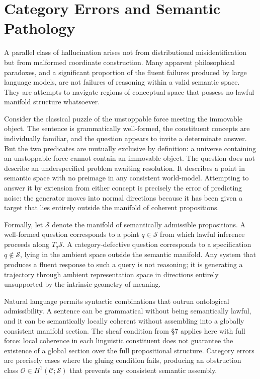 \documentclass[11pt,a4paper,twocolumn]{article}
\begin{document}
\section{Category Errors and Semantic Pathology}

A parallel class of hallucination arises not from distributional
misidentification but from malformed coordinate construction. Many
apparent philosophical paradoxes, and a significant proportion of
the fluent failures produced by large language models, are not
failures of reasoning within a valid semantic space. They are
attempts to navigate regions of conceptual space that possess no
lawful manifold structure whatsoever.

Consider the classical puzzle of the unstoppable force meeting the
immovable object. The sentence is grammatically well-formed, the
constituent concepts are individually familiar, and the question
appears to invite a determinate answer. But the two predicates are
mutually exclusive by definition: a universe containing an
unstoppable force cannot contain an immovable object. The question
does not describe an underspecified problem awaiting resolution. It
describes a point in semantic space with no preimage in any
consistent world-model. Attempting to answer it by extension from
either concept is precisely the error of predicting noise: the
generator moves into normal directions because it has been given
a target that lies entirely outside the manifold of coherent
propositions.

Formally, let $\mathcal{S}$ denote the manifold of semantically
admissible propositions. A well-formed question corresponds to a
point $q \in \mathcal{S}$ from which lawful inference proceeds
along $T_q \mathcal{S}$. A category-defective question corresponds
to a specification $q \notin \mathcal{S}$, lying in the ambient
space outside the semantic manifold. Any system that produces a
fluent response to such a query is not reasoning; it is generating
a trajectory through ambient representation space in directions
entirely unsupported by the intrinsic geometry of meaning.

Natural language permits syntactic combinations that outrun
ontological admissibility. A sentence can be grammatical without
being semantically lawful, and it can be semantically locally
coherent without assembling into a globally consistent manifold
section. The sheaf condition from \S7 applies here with full
force: local coherence in each linguistic constituent does not
guarantee the existence of a global section over the full
propositional structure. Category errors are precisely cases
where the gluing condition fails, producing an obstruction
class $\mathcal{O} \in H^1(\mathcal{C}; \mathcal{S})$ that
prevents any consistent semantic assembly.
\end{document}
